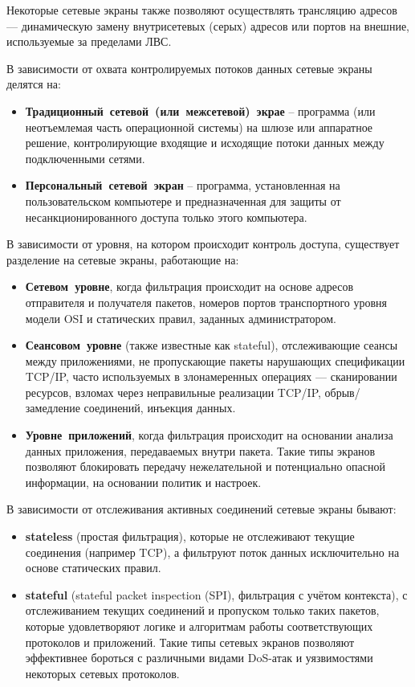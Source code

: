\documentclass[a4paper]{article}
\begin{document}
		Некоторые сетевые экраны также позволяют осуществлять трансляцию адресов --- динамическую замену внутрисетевых (серых) адресов или портов на внешние, используемые за пределами ЛВС.
	
		В зависимости от охвата контролируемых потоков данных сетевые экраны делятся на:
		\begin{itemize}
			\item \textbf{Традиционный сетевой (или межсетевой) экрае} -- программа (или неотъемлемая часть операционной системы) на шлюзе или аппаратное решение, контролирующие входящие и исходящие потоки данных между подключенными сетями.
			\item \textbf{Персональный сетевой экран} -- программа, установленная на пользовательском компьютере и предназначенная для защиты от несанкционированного доступа только этого компьютера.
		\end{itemize}
		В зависимости от уровня, на котором происходит контроль доступа, существует разделение на сетевые экраны, работающие на:
		\begin{itemize}
			\item \textbf{Сетевом уровне}, когда фильтрация происходит на основе адресов отправителя и получателя пакетов, номеров портов транспортного уровня модели OSI и статических правил, заданных администратором.
			\item \textbf{Сеансовом уровне} (также известные как stateful), отслеживающие сеансы между приложениями, не пропускающие пакеты нарушающих спецификации TCP/IP, часто используемых в злонамеренных операциях --- сканировании ресурсов, взломах через неправильные реализации TCP/IP, обрыв/замедление соединений, инъекция данных.
			\item \textbf{Уровне приложений}, когда фильтрация происходит на основании анализа данных приложения, передаваемых внутри пакета. Такие типы экранов позволяют блокировать передачу нежелательной и потенциально опасной информации, на основании политик и настроек.
		\end{itemize}
		В зависимости от отслеживания активных соединений сетевые экраны бывают:
		\begin{itemize}
			\item \textbf{stateless} (простая фильтрация), которые не отслеживают текущие соединения (например TCP), а фильтруют поток данных исключительно на основе статических правил.
			\item \textbf{stateful} (stateful packet inspection (SPI), фильтрация с учётом контекста), с отслеживанием текущих соединений и пропуском только таких пакетов, которые удовлетворяют логике и алгоритмам работы соответствующих протоколов и приложений. Такие типы сетевых экранов позволяют эффективнее бороться с различными видами DoS-атак и уязвимостями некоторых сетевых протоколов.
		\end{itemize}
		
\end{document}
